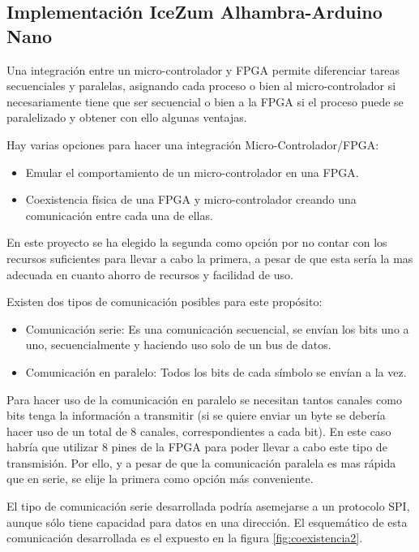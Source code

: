 \subsection{Implementación IceZum Alhambra-Arduino Nano}\label{sec:Integracion}

Una integración entre un micro-controlador y FPGA permite diferenciar tareas secuenciales y paralelas, asignando cada proceso o bien al micro-controlador si necesariamente tiene que ser secuencial o bien a la FPGA si el proceso puede se paralelizado y obtener con ello algunas ventajas. \newline

Hay varias opciones para hacer una integración Micro-Controlador/FPGA:

\begin{itemize}
	\item Emular el comportamiento de un micro-controlador en una FPGA.
	\item Coexistencia física de una FPGA y micro-controlador creando una comunicación entre cada una de ellas.
\end{itemize}
En este proyecto se ha elegido la segunda como opción por no contar con los recursos suficientes para llevar a cabo la primera, a pesar de que esta sería la mas adecuada en cuanto ahorro de recursos y facilidad de uso. \newline

Existen dos tipos de comunicación posibles para este propósito: 
\begin{itemize}
	\item Comunicación serie: Es una comunicación secuencial, se envían los bits uno a uno, secuencialmente y haciendo uso solo de un bus de datos.
	\item Comunicación en paralelo: Todos los bits de cada símbolo se envían a la vez.
\end{itemize} 

Para hacer uso de la comunicación en paralelo se necesitan tantos canales como bits tenga la información a transmitir (si se quiere enviar un byte se debería hacer uso de un total de 8 canales, correspondientes a cada bit). En este caso habría que utilizar 8 pines de la FPGA para poder llevar a cabo este tipo de transmisión. Por ello, y a pesar de que la comunicación paralela es mas rápida que en serie, se elije la primera como opción más conveniente. \newline

El tipo de comunicación serie desarrollada podría asemejarse a un protocolo SPI, aunque sólo tiene capacidad para datos en una dirección. El esquemático de esta comunicación desarrollada es el expuesto en la figura \ref{fig:coexistencia2}.

